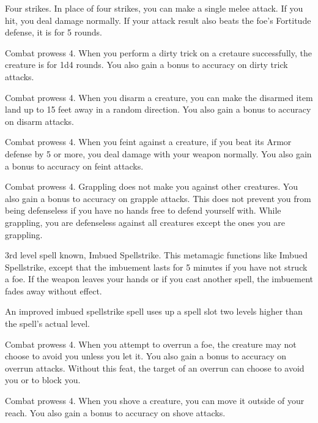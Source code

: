 \featpre Four strikes.
\featben In place of four strikes, you can make a single melee attack.
If you hit, you deal damage normally.
If your attack result also beats the foe's Fortitude defense, it is \immobilized for 5 rounds.

\featpre Combat prowess 4.
\featben When you perform a dirty trick on a cretaure successfully, the creature is \impaired for 1d4 rounds.
You also gain a  bonus to accuracy on dirty trick attacks.

\featpre Combat prowess 4.
\featben When you disarm a creature, you can make the disarmed item land up to 15 feet away in a random direction.
You also gain a  bonus to accuracy on disarm attacks.

\featpre Combat prowess 4.
\featben When you feint against a creature, if you beat its Armor defense by 5 or more, you deal damage with your weapon normally.
You also gain a  bonus to accuracy on feint attacks.

\featpre Combat prowess 4.
\featben Grappling does not make you  against other creatures.
You also gain a  bonus to accuracy on grapple attacks.
This does not prevent you from being defenseless if you have no hands free to defend yourself with.
While grappling, you are defenseless against all creatures except the ones you are grappling.

\featpres 3rd level spell known, Imbued Spellstrike.
\featben This metamagic functions like Imbued Spellstrike, except that the imbuement lasts for 5 minutes if you have not struck a foe.
If the weapon leaves your hands or if you cast another spell, the imbuement fades away without effect.

An improved imbued spellstrike spell uses up a spell slot two levels higher than the spell's actual level.

\featpre Combat prowess 4.
\featben When you attempt to overrun a foe, the creature may not choose to avoid you unless you let it.
You also gain a  bonus to accuracy on overrun attacks.
Without this feat, the target of an overrun can choose to avoid you or to block you.

\featpre Combat prowess 4.
\featben When you shove a creature, you can move it outside of your reach.
You also gain a  bonus to accuracy on shove attacks.

